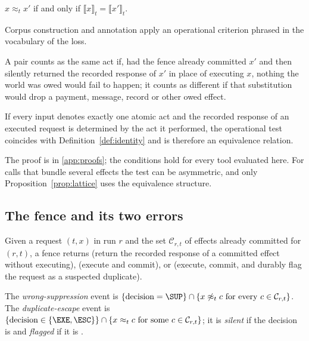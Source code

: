\begin{definition}\label{def:identity}
$x\approx_t x'$ if and only if $\llbracket x\rrbracket_t=\llbracket x'\rrbracket_t$.
\end{definition}

Corpus construction and annotation apply an operational criterion phrased in the vocabulary of the loss.

\begin{definition}\label{def:operational}
A pair counts as the same act if, had the fence already committed $x'$ and then silently returned the recorded response of $x'$ in place of executing $x$, nothing the world was owed would fail to happen; it counts as different if that substitution would drop a payment, message, record or other owed effect.
\end{definition}

\begin{proposition}\label{prop:equivalence}
If every input denotes exactly one atomic act and the recorded response of an executed request is determined by the act it performed, the operational test coincides with Definition~\ref{def:identity} and is therefore an equivalence relation.
\end{proposition}

The proof is in \ref{app:proofs}; the conditions hold for every tool evaluated here. For calls that bundle several effects the test can be asymmetric, and only Proposition~\ref{prop:lattice} uses the equivalence structure.

\subsection{The fence and its two errors}

\begin{definition}[Fence]\label{def:fence}
Given a request $(t,x)$ in run $r$ and the set $\mathcal{C}_{r,t}$ of effects already committed for $(r,t)$, a fence returns \SUP{} (return the recorded response of a committed effect without executing), \EXE{} (execute and commit), or \ESC{} (execute, commit, and durably flag the request as a suspected duplicate).
\end{definition}

\begin{definition}[Errors]\label{def:errors}
The \emph{wrong-suppression} event is $\{\text{decision}=\SUP\}\cap\{x\not\approx_t c\ \text{for every } c\in\mathcal{C}_{r,t}\}$. The \emph{duplicate-escape} event is $\{\text{decision}\in\{\EXE,\ESC\}\}\cap\{x\approx_t c\ \text{for some } c\in\mathcal{C}_{r,t}\}$; it is \emph{silent} if the decision is \EXE{} and \emph{flagged} if it is \ESC.
\end{definition}

